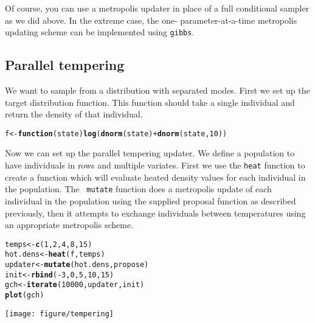 \documentclass{article}\usepackage[]{graphicx}\usepackage[]{color}
\makeatletter
\newcommand{\hlnum}[1]{\textcolor[rgb]{0.686,0.059,0.569}{#1}}%
\newcommand{\hlopt}[1]{\textcolor[rgb]{0,0,0}{#1}}%
\newcommand{\hlstd}[1]{\textcolor[rgb]{0.345,0.345,0.345}{#1}}%
\newcommand{\hlkwa}[1]{\textcolor[rgb]{0.161,0.373,0.58}{\textbf{#1}}}%
\newcommand{\hlkwb}[1]{\textcolor[rgb]{0.69,0.353,0.396}{#1}}%
\newcommand{\hlkwc}[1]{\textcolor[rgb]{0.333,0.667,0.333}{#1}}%
\newcommand{\hlkwd}[1]{\textcolor[rgb]{0.737,0.353,0.396}{\textbf{#1}}}%
\newenvironment{kframe}{%
 \def\at@end@of@kframe{}%
 \ifinner\ifhmode%
  \def\at@end@of@kframe{\end{minipage}}%
  \begin{minipage}{\columnwidth}%
 \fi\fi%
 \def\FrameCommand##1{\hskip\@totalleftmargin \hskip-\fboxsep
 \colorbox{shadecolor}{##1}\hskip-\fboxsep
     \hskip-\linewidth \hskip-\@totalleftmargin \hskip\columnwidth}%
 \MakeFramed {\advance\hsize-\width
   \@totalleftmargin\z@ \linewidth\hsize
   \@setminipage}}%
 {\par\unskip\endMakeFramed%
 \at@end@of@kframe}
\newenvironment{knitrout}{}{} %
\makeatother
\begin{document}
Of course, you can use a metropolis updater in place of a full
conditional sampler as we did above. In the extreme case, the one-
parameter-at-a-time metropolis updating scheme can be implemented
using {\tt gibbs}.

\subsection{Parallel tempering}
We want to sample from a distribution with separated modes.  First we
set up the target distribution function. This function should take a
single individual and return the density of that individual.
\begin{knitrout}
\color{fgcolor}\begin{kframe}
\begin{alltt}
\hlstd{f} \hlkwb{<-} \hlkwa{function}\hlstd{(}\hlkwc{state}\hlstd{)} \hlkwd{log}\hlstd{(}\hlkwd{dnorm}\hlstd{(state)} \hlopt{+} \hlkwd{dnorm}\hlstd{(state,} \hlnum{10}\hlstd{))}
\end{alltt}
\end{kframe}
\end{knitrout}


Now we can set up the parallel tempering updater. We define a
population to have individuals in rows and multiple variates. First we
use the {\tt heat} function to create a function which will evaluate
heated density values for each individual in the population. The {\tt
  mutate} function does a metropolis update of each individual in the
population using the supplied proposal function as described
previously, then it attempts to exchange individuals between
temperatures using an appropriate metropolis scheme.

\begin{knitrout}
\color{fgcolor}\begin{kframe}
\begin{alltt}
\hlstd{temps} \hlkwb{<-} \hlkwd{c}\hlstd{(}\hlnum{1}\hlstd{,} \hlnum{2}\hlstd{,} \hlnum{4}\hlstd{,} \hlnum{8}\hlstd{,} \hlnum{15}\hlstd{)}
\hlstd{hot.dens} \hlkwb{<-} \hlkwd{heat}\hlstd{(f, temps)}
\hlstd{updater} \hlkwb{<-} \hlkwd{mutate}\hlstd{(hot.dens, propose)}
\hlstd{init} \hlkwb{<-} \hlkwd{rbind}\hlstd{(}\hlopt{-}\hlnum{3}\hlstd{,} \hlnum{0}\hlstd{,} \hlnum{5}\hlstd{,} \hlnum{10}\hlstd{,} \hlnum{15}\hlstd{)}
\hlstd{gch} \hlkwb{<-} \hlkwd{iterate}\hlstd{(}\hlnum{10000}\hlstd{, updater, init)}
\hlkwd{plot}\hlstd{(gch)}
\end{alltt}
\end{kframe}

{\centering \texttt{[image: figure/tempering]} 

}



\end{knitrout}
\end{document}
